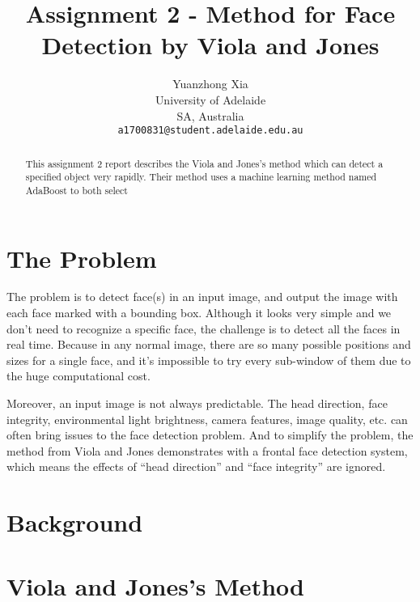 \documentclass[10pt,twocolumn,letterpaper]{article}
\begin{document}
\title{Assignment 2 - Method for Face Detection by Viola and Jones}
\author{Yuanzhong Xia\\
University of Adelaide\\
SA, Australia\\
{\tt\small a1700831@student.adelaide.edu.au}
}
\maketitle

\begin{abstract}
This assignment 2 report describes the Viola and Jones's method{\cite{origin}} which can detect a specified object very rapidly.
Their method uses a machine learning method named AdaBoost to both select 

\end{abstract}


\section{The Problem}
The problem is to detect face(s) in an input image, and output the image with each face marked with a bounding box.
Although it looks very simple and we don't need to recognize a specific face, the challenge is to detect all the faces in real time.
Because in any normal image, there are so many possible positions and sizes for a single face,
and it's impossible to try every sub-window of them due to the huge computational cost.

Moreover, an input image is not always predictable. The head direction, face integrity, environmental light brightness,
camera features, image quality, etc. can often bring issues to the face detection problem.
And to simplify the problem, the method from Viola and Jones demonstrates with a frontal face detection system,
which means the effects of ``head direction'' and ``face integrity'' are ignored.

\section{Background}


\section{Viola and Jones's Method}

\end{document}
